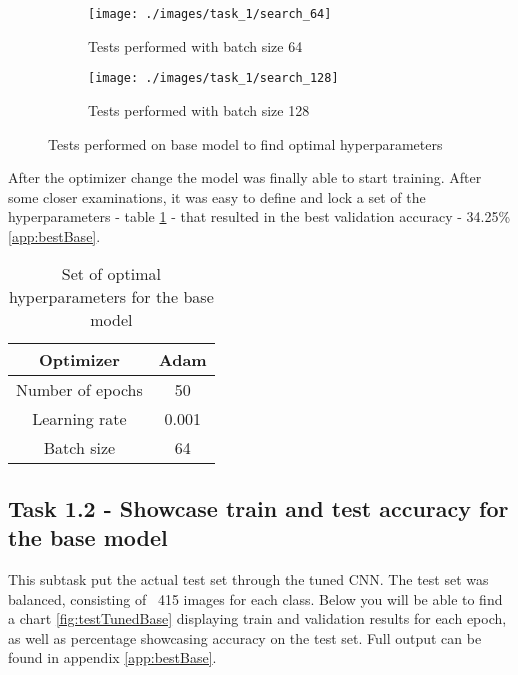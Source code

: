 \documentclass{article} %
\begin{document}
\begin{figure}[h!]
    \begin{subfigure}[b]{0.43\textwidth}
         \centering
         \texttt{[image: ./images/task\_1/search\_64]}
         \caption{Tests performed with batch size 64}
         \label{fig:batch64}
    \end{subfigure}
    \hfill
    \begin{subfigure}[b]{0.43\textwidth}
        \centering
         \texttt{[image: ./images/task\_1/search\_128]}
         \caption{Tests performed with batch size 128}
         \label{fig:batch128}
    \end{subfigure}
    \caption{Tests performed on base model to find optimal hyperparameters}
    \label{fig:trainBase}  
\end{figure}

After the optimizer change the model was finally able to start training. After some closer examinations, it was easy to define and lock a set of the hyperparameters - table \ref{table:2} - that resulted in the best validation accuracy - 34.25\% \ref{app:bestBase}.

\clearpage

\begin{table}[h!]
\centering
\begin{tabular}{ | c | c | }
\hline
 Optimizer & Adam\\ 
 \hline
 Number of epochs & 50 \\  
 \hline
 Learning rate & 0.001 \\
 \hline
 Batch size & 64\\
 \hline
\end{tabular}
\caption{Set of optimal hyperparameters for the base model}
\vspace{-20pt}
\label{table:2}
\end{table}


\subsection*{Task 1.2 - Showcase train and test accuracy for the base model}

This subtask put the actual test set through the tuned CNN. The test set was balanced, consisting of ~415 images for each class. Below you will be able to find a chart \ref{fig:testTunedBase} displaying train and validation results for each epoch, as well as percentage showcasing accuracy on the test set. Full output can be found in appendix \ref{app:bestBase}.
\end{document}
